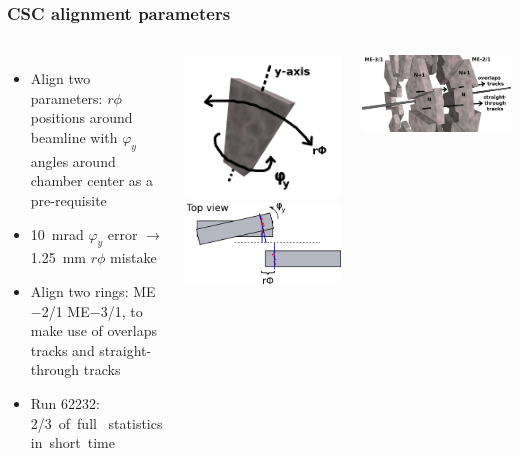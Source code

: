 \documentclass[compress]{beamer}
\begin{document}
\begin{frame}
\frametitle{CSC alignment parameters}

\begin{columns}
\small

\begin{itemize}\setlength{\itemsep}{0.1 cm}
\item Align two parameters: $r\phi$ positions around beamline
with $\varphi_y$ angles around chamber center as a pre-requisite
\item 10~mrad $\varphi_y$ error $\to$ 1.25~mm $r\phi$ mistake
\item Align two rings: ME$-$2/1 ME$-$3/1, to make use of overlaps tracks and straight-through tracks
\item Run 62232: \mbox{2/3 of full \hspace{-0.5 cm}} statistics \mbox{in short time\hspace{-1 cm}}
\end{itemize}


\includegraphics[width=0.38\linewidth]{one_chamber.png} \includegraphics[width=0.62\linewidth]{order_of_parameters.png}

\vspace{1 cm}

\includegraphics[width=\linewidth]{overlaps_straight_through.png}

\end{columns}
\end{frame}
\end{document}
